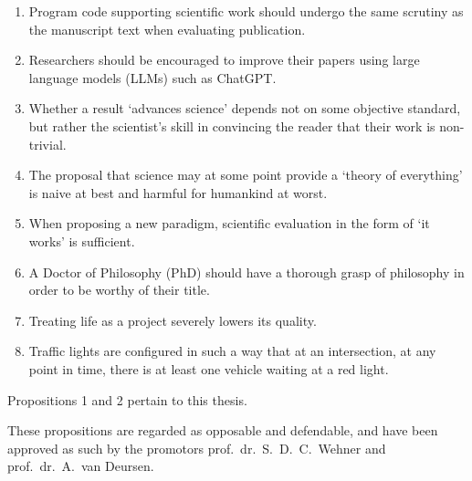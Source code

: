 \begin{enumerate}[widest=10]
  \item Program code supporting scientific work should undergo the same scrutiny as the manuscript text when evaluating publication.
  \item Researchers should be encouraged to improve their papers using large language models (LLMs) such as ChatGPT.
  \item Whether a result `advances science' depends not on some objective standard, but rather the scientist's skill in convincing the reader that their work is non-trivial.
  \item The proposal that science may at some point provide a `theory of everything' is naive at best and harmful for humankind at worst.
  \item When proposing a new paradigm, scientific evaluation in the form of `it works' is sufficient.
  \item A Doctor of Philosophy (PhD) should have a thorough grasp of philosophy in order to be worthy of their title.
  \item Treating life as a project severely lowers its quality.
  \item Traffic lights are configured in such a way that at an intersection, at any point in time, there is at least one vehicle waiting at a red light.

\end{enumerate}

\bigskip \noindent
Propositions 1 and 2 pertain to this thesis.

\bigskip \noindent
These propositions are regarded as opposable and defendable, and have been approved as such by the
promotors prof.\ dr.\ S.\ D.\ C.\ Wehner and prof.\ dr.\ A.\ van Deursen.
